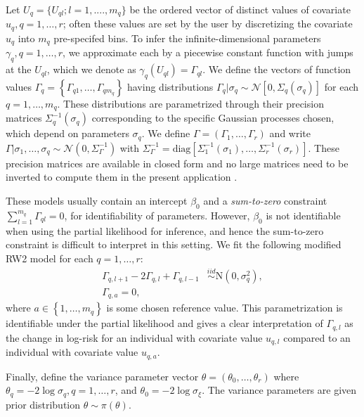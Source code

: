 \documentclass[ba]{imsart}
\begin{document}
Let $U_{q} = \{U_{ql};l = 1, ...., m_q\}$ be the ordered vector of distinct values of covariate $u_q,q = 1,\ldots,r$; often these values are set by the user by discretizing the covariate $u_q$ into $m_q$ pre-specifed bins. To infer the infinite-dimensional parameters $\gamma_{q},q = 1,\ldots,r$, we approximate each by a piecewise constant function with jumps at the $U_{ql}$, which we denote as $\gamma_{q}(U_{ql}) = \Gamma_{ql}$. We define the vectors of function values $\Gamma_{q} = \left\{ \Gamma_{q1},\ldots,\Gamma_{qm_{q}}\right\}$ having distributions $\Gamma_{q}|\sigma_{q}\sim\mathcal{N}\left[ 0,\Sigma_{q}(\sigma_{q})\right]$ for each $q = 1,\ldots,m_{q}$. These distributions are parametrized through their precision matrices $\Sigma_{q}^{-1}(\sigma_{q})$ corresponding to the specific Gaussian processes chosen, which depend on parameters $\sigma_{q}$. We define $\Gamma = (\Gamma_{1},\ldots,\Gamma_{r})$ and write $\Gamma|\sigma_{1},\ldots,\sigma_{q}\sim\mathcal{N}\left( 0,\Sigma^{-1}_{\Gamma}\right)$ with $\Sigma^{-1}_{\Gamma} = \text{diag}\left[ \Sigma_{1}^{-1}(\sigma_{1}),\ldots,\Sigma_{r}^{-1}(\sigma_{r})\right]$. These precision matrices are available in closed form and no large matrices need to be inverted to compute them in the present application \citep{rw2}.

These models usually contain an intercept $\beta_{0}$ and a \emph{sum-to-zero} constraint $\sum_{l=1}^{m_q}\Gamma_{ql} = 0$, for identifiability of parameters. However, $\beta_{0}$ is not identifiable when using the partial likelihood for inference, and hence the sum-to-zero constraint is difficult to interpret in this setting. We fit the following modified RW2 model for each $q = 1,\ldots,r$:
\begin{equation}\begin{aligned}\label{eqn:rw2}
\Gamma_{q,l+1} - 2\Gamma_{q,l} + \Gamma_{q,l-1} &\overset{iid}{\sim}\text{N}\left( 0,\sigma^{2}_{q}\right), \\
\Gamma_{q,a} = 0,
\end{aligned}\end{equation}
where $a\in\left\lbrace 1,\ldots,m_{q}\right\rbrace$ is some chosen reference value. This parametrization is identifiable under the partial likelihood and gives a clear interpretation of $\Gamma_{q,l}$ as the change in log-risk for an individual with covariate value $u_{q,l}$ compared to an individual with covariate value $u_{q,a}$. 

Finally, define the variance parameter vector $\theta = (\theta_{0},\ldots,\theta_{r})$ where $\theta_{q} = -2\log\sigma_{q},q = 1,\ldots,r$, and $\theta_{0} = -2\log\sigma_{\xi}$. The variance parameters are given prior distribution $\theta \sim \pi(\theta)$. 
\end{document}
